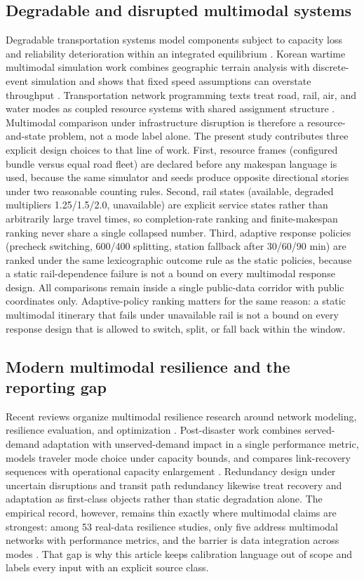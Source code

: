 \documentclass{ieeeaccess}
\begin{document}
\subsection{Degradable and disrupted multimodal systems}
Degradable transportation systems model components subject to capacity loss and reliability deterioration within an integrated equilibrium \cite{b14}. Korean wartime multimodal simulation work combines geographic terrain analysis with discrete-event simulation and shows that fixed speed assumptions can overstate throughput \cite{b1}. Transportation network programming texts treat road, rail, air, and water modes as coupled resource systems with shared assignment structure \cite{b24}. Multimodal comparison under infrastructure disruption is therefore a resource-and-state problem, not a mode label alone. The present study contributes three explicit design choices to that line of work. First, resource frames (configured bundle versus equal road fleet) are declared before any makespan language is used, because the same simulator and seeds produce opposite directional stories under two reasonable counting rules. Second, rail states (available, degraded multipliers 1.25/1.5/2.0, unavailable) are explicit service states rather than arbitrarily large travel times, so completion-rate ranking and finite-makespan ranking never share a single collapsed number. Third, adaptive response policies (precheck switching, 600/400 splitting, station fallback after 30/60/90 min) are ranked under the same lexicographic outcome rule as the static policies, because a static rail-dependence failure is not a bound on every multimodal response design. All comparisons remain inside a single public-data corridor with public coordinates only. Adaptive-policy ranking matters for the same reason: a static multimodal itinerary that fails under unavailable rail is not a bound on every response design that is allowed to switch, split, or fall back within the window.

 \subsection{Modern multimodal resilience and the reporting gap}
Recent reviews organize multimodal resilience research around network modeling, resilience evaluation, and optimization \cite{b31}. Post-disaster work combines served-demand adaptation with unserved-demand impact in a single performance metric, models traveler mode choice under capacity bounds, and compares link-recovery sequences with operational capacity enlargement \cite{b33}. Redundancy design under uncertain disruptions \cite{b34} and transit path redundancy \cite{b35} likewise treat recovery and adaptation as first-class objects rather than static degradation alone. The empirical record, however, remains thin exactly where multimodal claims are strongest: among 53 real-data resilience studies, only five address multimodal networks with performance metrics, and the barrier is data integration across modes \cite{b32}. That gap is why this article keeps calibration language out of scope and labels every input with an explicit source class.
\end{document}
